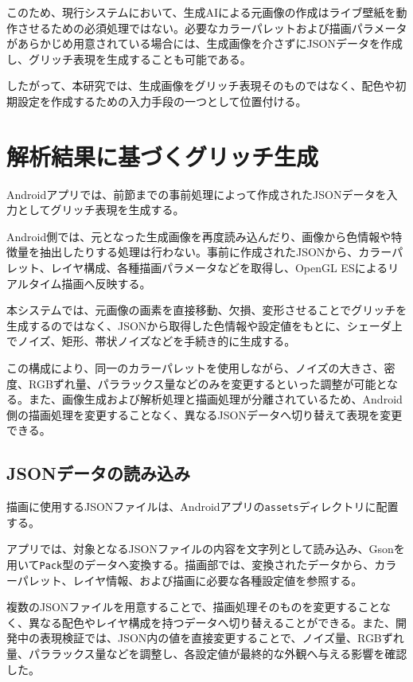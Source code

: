 このため、現行システムにおいて、生成AIによる元画像の作成はライブ壁紙を動作させるための必須処理ではない。必要なカラーパレットおよび描画パラメータがあらかじめ用意されている場合には、生成画像を介さずにJSONデータを作成し、グリッチ表現を生成することも可能である。

したがって、本研究では、生成画像をグリッチ表現そのものではなく、配色や初期設定を作成するための入力手段の一つとして位置付ける。


\section{解析結果に基づくグリッチ生成}

Androidアプリでは、前節までの事前処理によって作成されたJSONデータを入力としてグリッチ表現を生成する。

Android側では、元となった生成画像を再度読み込んだり、画像から色情報や特徴量を抽出したりする処理は行わない。事前に作成されたJSONから、カラーパレット、レイヤ構成、各種描画パラメータなどを取得し、OpenGL ESによるリアルタイム描画へ反映する。

本システムでは、元画像の画素を直接移動、欠損、変形させることでグリッチを生成するのではなく、JSONから取得した色情報や設定値をもとに、シェーダ上でノイズ、矩形、帯状ノイズなどを手続き的に生成する。

この構成により、同一のカラーパレットを使用しながら、ノイズの大きさ、密度、RGBずれ量、パララックス量などのみを変更するといった調整が可能となる。また、画像生成および解析処理と描画処理が分離されているため、Android側の描画処理を変更することなく、異なるJSONデータへ切り替えて表現を変更できる。


\subsection{JSONデータの読み込み}

描画に使用するJSONファイルは、Androidアプリの\texttt{assets}ディレクトリに配置する。

アプリでは、対象となるJSONファイルの内容を文字列として読み込み、Gsonを用いて\texttt{Pack}型のデータへ変換する。描画部では、変換されたデータから、カラーパレット、レイヤ情報、および描画に必要な各種設定値を参照する。

複数のJSONファイルを用意することで、描画処理そのものを変更することなく、異なる配色やレイヤ構成を持つデータへ切り替えることができる。また、開発中の表現検証では、JSON内の値を直接変更することで、ノイズ量、RGBずれ量、パララックス量などを調整し、各設定値が最終的な外観へ与える影響を確認した。

